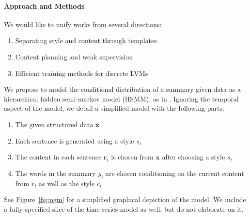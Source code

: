 \documentclass[11pt]{article}
\newcommand{\Cat}{\mathrm{Cat}}
\newcommand\Unif{\mathrm{Unif}}
\newcommand{\br}{\mathbf{r}}
\newcommand{\bx}{\mathbf{x}}
\begin{document}
\paragraph{Approach and Methods}
We would like to unify works from several directions:
\begin{enumerate}
\item Separating style and content through templates \citep{sauper2009wiki,wiseman2018template}
\item Content planning and weak supervision \citep{puduppully2018contentselection}
\item Efficient training methods for discrete LVMs \citep{deng2018vattn}
\end{enumerate}
We propose to model the conditional distribution of a summary given data as a 
hierarchical hidden semi-markov model (HSMM), as in \citep{liang2009semalign}.
Ignoring the temporal aspect of the model, we detail a simplified model
with the following parts:
\begin{enumerate}
\item The given structured data $\bx$ 
\item Each sentence is generated using a style $s_i$
\item The content in each sentence $\br_i$ is chosen from $\bx$
after choosing a style $s_i$
\item The words in the summary $y_i$ are chosen conditioning on
the current content from $r_i$ as well as the style $c_i$
\end{enumerate}
\begin{comment}
We also present a more detailed model:
\begin{enumerate}
\item The style features $s_t\mid y_{t-1},s_{t-1},\bx\sim\Cat()$
\item The record choices $r_t\mid r_{t-1}^D,r_{t-1},s_t,\bx\sim\Cat()$
\item The record duration is given by 
$r_t^D\mid r_{t-1}^D=0,r_t\sim\Unif(1,\ldots,L)$
where $L$ is the max segment length and $r_t^D\mid r_{t-1}^D=x = x-1$

\item The words in the summary $y_t\mid y_{<t},r_t,s_t\sim\Cat()$
\end{enumerate}
\end{comment}
See Figure~\ref{fig:pgm} for a simplified graphical depiction of the model.
We include a fully-specified slice of the time-series model as well,
but do not elaborate on it.
\end{document}
